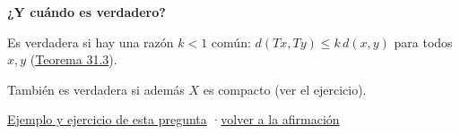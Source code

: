 \documentclass[11pt,a4paper]{article}
\providecommand{\lt}{<}\providecommand{\gt}{>}
\newcommand{\bloque}[1]{\par\smallskip\noindent\textbf{\color{acento}#1}\par}
\begin{document}
\bloque{¿Y cuándo es verdadero?}
\begin{pasos}
\item[] Es verdadera si hay una razón $k\lt 1$ común: $d(Tx,Ty)\le k\,d(x,y)$ para todos $x,y$ (\href{https://decostruttivismo.github.io/MAT2514-repaso/pdf/MAT2514_apuntes_completos.pdf\#nameddest=teorema.31.3}{Teorema 31.3}).
\item[] También es verdadera si además $X$ es compacto (ver el ejercicio).
\end{pasos}
\par{}
\par{\small \hyperlink{e-18}{Ejemplo y ejercicio de esta pregunta} \quad·\quad \hyperlink{q-18}{volver a la afirmación}}
\end{document}
